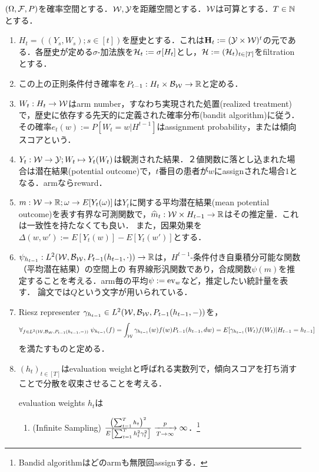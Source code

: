 \documentclass[uplatex,dvipdfmx]{jsreport}
\begin{document}
\begin{definition}
    $(\Omega,\mathcal{F},P)$を確率空間とする．$\mathcal{W},\mathcal{Y}$を距離空間とする．$\mathcal{W}$は可算とする．$T\in\mathbb{N}$とする．
    \begin{enumerate}
        \item $H_t=((Y_s,W_s);s\in [t])$を歴史とする．これは$\mathbf{H}_t:=(\mathcal{Y}\times\mathcal{W})^t$の元である．各歴史が定める$\sigma$-加法族を$\mathcal{H}_t:=\sigma[H_t]$とし，$\mathcal{H}:=(\mathcal{H}_t)_{t\in[T]}$をfiltrationとする．
        \item この上の正則条件付き確率を$P_{t-1}:H_t\times\mathcal{B}_{\mathcal{W}}\to\mathbb{R}$と定める．
        \item $W_t:H_t\to\mathcal{W}$はarm number，すなわち実現された処置(realized treatment)で，歴史に依存する先天的に定義された確率分布(bandit algorithm)に従う．
        その確率$e_t(w):=P[W_t=w|H^{t-1}]$はassignment probability，または傾向スコアという．
        \item $Y_t:\mathcal{W}\to\mathcal{Y};W_t\mapsto Y_t(W_t)$は観測された結果．２値関数に落とし込まれた場合は潜在結果(potential outcome)で，$t$番目の患者が$w$にassignされた場合$1$となる．armならreward．
        \item $m:\mathcal{W}\to\mathbb{R};\omega\to E[Y_t(\omega)]$は$Y_t$に関する平均潜在結果(mean potential outcome)を表す有界な可測関数で，$\widehat{m}_t:\mathcal{W}\times H_{t-1}\to\mathbb{R}$はその推定量．これは一致性を持たなくても良い．
        また，因果効果を$\Delta(w,w'):=E[Y_t(w)]-E[Y_t(w')]$とする．
        \item $\psi_{h_{t-1}}:L^2(\mathcal{W},\mathcal{B}_{\mathcal{W}},P_{t-1}(h_{t-1},\cdot))\to\mathbb{R}$は，$H^{t-1}$-条件付き自乗積分可能な関数（平均潜在結果）の空間上の
        有界線形汎関数であり，合成関数$\psi(m)$を推定することを考える．arm毎の平均$\psi:=\mathrm{ev}_w$など，推定したい統計量を表す．
        論文\cite{Policy Evaluation}では$Q$という文字が用いられている．
        \item Riesz representer $\gamma_{h_{t-1}}\in L^2(\mathcal{W},\mathcal{B}_{\mathcal{W}},P_{t-1}(h_{t-1},-))$を，
        \[\forall_{f\in L^2(\mathcal{W},\mathcal{B}_{\mathcal{W}},P_{t-1}(h_{t-1},-))}\;\psi_{h_{t-1}}(f)=\int_{\mathcal{W}}\gamma_{h_{t-1}}(w)f(w)P_{t-1}(h_{t-1},dw)=E[\gamma_{h_{t-1}}(W_t)f(W_t)|H_{t-1}=h_{t-1}]\]
        を満たすものと定める．
        \item $(h_t)_{t\in[T]}$はevaluation weightと呼ばれる実数列で，傾向スコアを打ち消すことで分散を収束させることを考える．
        \begin{axiom}\label{axiom-adaptive-weights}
            evaluation weights $h_t$は
            \begin{enumerate}
                \item (Infinite Sampling) $\frac{\left(\sum^T_{t=1}h_t\right)^2}{E\left[\sum^T_{t=1}h_t^2\gamma_t^2\right]}\xrightarrow[T\to\infty]{p}\infty$．\footnote{Bandid algorithmはどのarmも無限回assignする．}

\end{enumerate}
\end{axiom}
\end{enumerate}
\end{definition}
\end{document}
